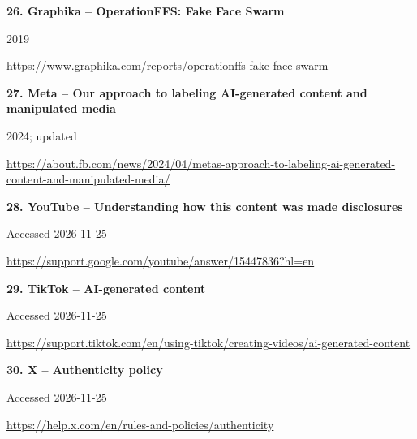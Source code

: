\documentclass[11pt,a4paper]{article}
\begin{document}
\noindent\begin{minipage}{\linewidth}\textbf{26. Graphika -- OperationFFS: Fake Face Swarm}\par{\small 2019\par\url{https://www.graphika.com/reports/operationffs-fake-face-swarm}}\par
\end{minipage}\par\vspace{2mm}
\noindent\begin{minipage}{\linewidth}\textbf{27. Meta -- Our approach to labeling AI-generated content and manipulated media}\par{\small 2024; updated\par\url{https://about.fb.com/news/2024/04/metas-approach-to-labeling-ai-generated-content-and-manipulated-media/}}\par
\end{minipage}\par\vspace{2mm}
\noindent\begin{minipage}{\linewidth}\textbf{28. YouTube -- Understanding how this content was made disclosures}\par{\small Accessed 2026-11-25\par\url{https://support.google.com/youtube/answer/15447836?hl=en}}\par
\end{minipage}\par\vspace{2mm}
\noindent\begin{minipage}{\linewidth}\textbf{29. TikTok -- AI-generated content}\par{\small Accessed 2026-11-25\par\url{https://support.tiktok.com/en/using-tiktok/creating-videos/ai-generated-content}}\par
\end{minipage}\par\vspace{2mm}
\noindent\begin{minipage}{\linewidth}\textbf{30. X -- Authenticity policy}\par{\small Accessed 2026-11-25\par\url{https://help.x.com/en/rules-and-policies/authenticity}}\par
\end{minipage}\par\vspace{2mm}
\end{document}
